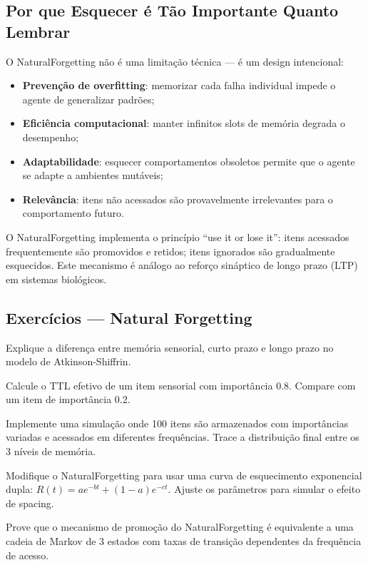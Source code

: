 \subsection{Por que Esquecer é Tão Importante Quanto Lembrar}

O NaturalForgetting não é uma limitação técnica — é um design
intencional:

\begin{itemize}
\item \textbf{Prevenção de overfitting}: memorizar cada falha
individual impede o agente de generalizar padrões;
\item \textbf{Eficiência computacional}: manter infinitos slots de
memória degrada o desempenho;
\item \textbf{Adaptabilidade}: esquecer comportamentos obsoletos
permite que o agente se adapte a ambientes mutáveis;
\item \textbf{Relevância}: itens não acessados são provavelmente
irrelevantes para o comportamento futuro.
\end{itemize}

\begin{observacao}
O NaturalForgetting implementa o princípio ``use it or lose it'':
itens acessados frequentemente são promovidos e retidos; itens
ignorados são gradualmente esquecidos. Este mecanismo é análogo ao
reforço sináptico de longo prazo (LTP) em sistemas biológicos.
\end{observacao}

\subsection{Exercícios — Natural Forgetting}
\begin{exercicio}
Explique a diferença entre memória sensorial, curto prazo e longo
prazo no modelo de Atkinson-Shiffrin.
\end{exercicio}
\begin{exercicio}
Calcule o TTL efetivo de um item sensorial com importância 0.8.
Compare com um item de importância 0.2.
\end{exercicio}
\begin{exercicio}
Implemente uma simulação onde 100 itens são armazenados com
importâncias variadas e acessados em diferentes frequências.
Trace a distribuição final entre os 3 níveis de memória.
\end{exercicio}
\begin{exercicio}
Modifique o NaturalForgetting para usar uma curva de esquecimento
exponencial dupla: $R(t) = ae^{-bt} + (1-a)e^{-ct}$. Ajuste os
parâmetros para simular o efeito de spacing.
\end{exercicio}
\begin{exercicio}
Prove que o mecanismo de promoção do NaturalForgetting é equivalente
a uma cadeia de Markov de 3 estados com taxas de transição dependentes
da frequência de acesso.
\end{exercicio}

